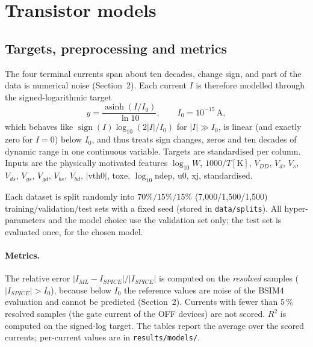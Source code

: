 \section{Transistor models}\label{sec:models}
\subsection{Targets, preprocessing and metrics}
The four terminal currents span about ten decades, change sign, and part of the data is numerical noise (Section~2). Each current $I$ is therefore
modelled through the signed-logarithmic target
\[
  y=\frac{\operatorname{asinh}(I/I_0)}{\ln 10},\qquad I_0=10^{-15}\,\mathrm{A},
\]
which behaves like $\operatorname{sign}(I)\log_{10}(2|I|/I_0)$ for $|I|\gg I_0$, is linear (and exactly zero for $I=0$) below $I_0$, and thus treats
sign changes, zeros and ten decades of dynamic range in one continuous variable. Targets are standardised per column. Inputs are the
physically motivated features $\log_{10}W$, $1000/T[\mathrm{K}]$, $V_{DD}$, $V_d$, $V_s$, $V_{ds}$, $V_{gs}$, $V_{gd}$, $V_{bs}$, $V_{bd}$, $|\text{vth0}|$,
toxe, $\log_{10}$ndep, u0, xj, standardised.

Each dataset is split randomly into $70\%/15\%/15\%$ (7{,}000/1{,}500/1{,}500) training/validation/test sets with a fixed seed (stored in \texttt{data/splits}).
All hyper-parameters and the model choice use the validation set only; the test set is evaluated once, for the chosen model.

\paragraph{Metrics.} The relative error $|I_{ML}-I_{SPICE}|/|I_{SPICE}|$ is computed on the \emph{resolved} samples ($|I_{SPICE}|>I_0$), because below $I_0$ the reference
values are noise of the BSIM4 evaluation and cannot be predicted (Section~2). Currents with fewer than 5\,\% resolved samples (the gate current of the OFF devices) are
not scored. $R^2$ is computed on the signed-log target. The tables report the average over the scored currents; per-current values are in \texttt{results/models/}.

